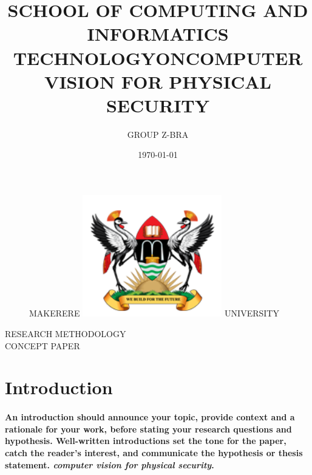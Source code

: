 \documentclass[11pt]{article}
\begin{document}
		
\title{SCHOOL OF COMPUTING AND INFORMATICS\\ TECHNOLOGY}
\author{GROUP Z-BRA}
\date{\today{}}
\begin{figure}
	\begin{center}
	\Huge MAKERERE \includegraphics[width=172pt]{muk.png} \Huge UNIVERSITY
	\end{center}
\end{figure}
	\maketitle
	
	\begin{center}
	RESEARCH METHODOLOGY \\CONCEPT PAPER
	\end{center}
\begin{center}
	\title{ON}
\end{center}
	\begin{center}
		\title{COMPUTER VISION FOR PHYSICAL SECURITY}
	\end{center}
    
	\newpage
	\tableofcontents
	
	\newpage
	\section{ \textbf{Introduction} }
	 \paragraph{\textmd{An introduction should announce your topic, provide context and a rationale for your work, before stating your research questions and hypothesis. Well-written introductions set the tone for the paper, catch the reader's interest, and communicate the hypothesis or thesis statement. \emph{computer vision for physical security}.}}
	 
\end{document}

